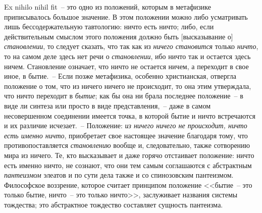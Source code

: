Ex nihilo nihil fit~-- это одно из положений, которым
в метафизике приписывалось большое значение. В этом
положении можно либо усматривать лишь бессодержательную
тавтологию: ничто есть ничто; либо, если действительным
смыслом этого положения должно быть
[высказывание о] \emph{становлении}, то следует сказать, что
так как из \emph{ничего становится} только \emph{ничто}, то на самом
деле здесь нет речи о \emph{становлении}, ибо ничто так и
остается здесь ничем. Становление означает, что ничто
не остается ничем, а переходит в свое иное, в бытие.~--
Если позже метафизика, особенно христианская, отвергла
положение о том, что из ничего ничего не происходит,
то она этим утверждала, что ничто переходит в \emph{бытие};
как бы она ни брала последнее положение~-- в виде ли
синтеза или просто в виде представления,~-- даже в самом
несовершенном соединении имеется точка, в которой
бытие и ничто встречаются и их различие исчезает.~--
Положение: \emph{из ничего ничего не происходит, ничто есть
именно ничто}, приобретает свое настоящее значение благодаря
тому, что противопоставляется \emph{становлению} вообще
и, следовательно, также сотворению мира из ничего.
Те, кто высказывает и даже горячо отстаивает положение:
ничто есть именно ничто, не сознают, что они тем
самым соглашаются с абстрактным \emph{пантеизмом} элеатов
и по сути дела также и со спинозовским пантеизмом.
Философское воззрение, которое считает принципом положение
<<бытие~-- это только бытие, ничто~-- это только
ничто>>, заслуживает названия системы тождества; это
абстрактное тождество составляет сущность пантеизма.


